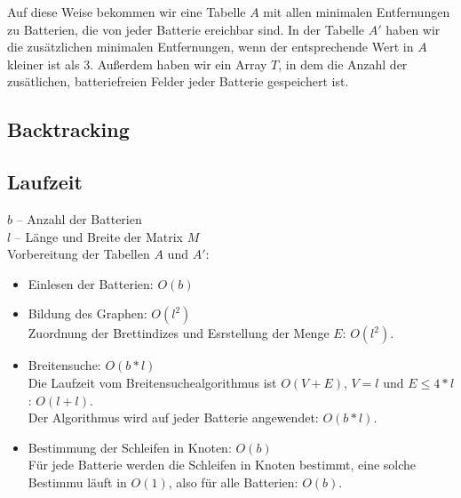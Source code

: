 \documentclass[a4paper,10pt,ngerman]{scrartcl}
\begin{document}
Auf diese Weise bekommen wir eine Tabelle $A$ mit allen minimalen Entfernungen zu Batterien, die von jeder Batterie
ereichbar sind. In der Tabelle $A'$ haben wir die zusätzlichen minimalen Entfernungen,
wenn der entsprechende Wert in $A$ kleiner ist als 3. Außerdem haben wir ein Array $T$, in dem die 
Anzahl der zusätlichen, batteriefreien Felder jeder Batterie gespeichert ist.

\subsection{Backtracking}

\subsection{Laufzeit}\label{sec:time}

$b$ -- Anzahl der Batterien\\
$l$ -- Länge und Breite der Matrix $M$\\

Vorbereitung der Tabellen $A$ und $A'$:
\begin{itemize}
  \item Einlesen der Batterien: $O(b)$
  \item Bildung des Graphen: $O(l^2)$\\
  Zuordnung der Brettindizes und Esrstellung der Menge $E$: $O(l^2)$.
  \item Breitensuche: $O(b*l)$\\
  Die Laufzeit vom Breitensuchealgorithmus ist $O(V + E)$, $V = l$ und $E \leqslant 4*l$: $O(l+l)$.\\
  Der Algorithmus wird auf jeder Batterie angewendet: $O(b*l)$.
  \item Bestimmung der Schleifen in Knoten: $O(b)$\\
  Für jede Batterie werden die Schleifen in Knoten bestimmt, eine solche Bestimmu läuft in $O(1)$,
  also für alle Batterien: $O(b)$.
\end{itemize}
\end{document}
